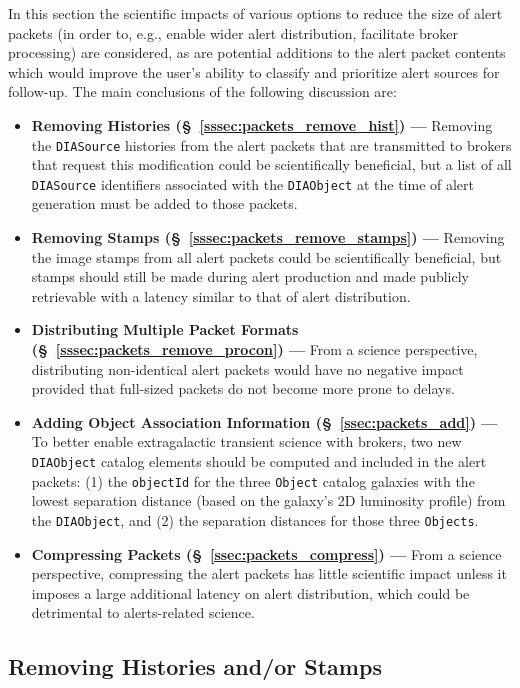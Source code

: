 \documentclass[DM,lsstdraft,authoryear,toc]{lsstdoc}
\begin{document}
In this section the scientific impacts of various options to reduce the size of alert packets (in order to, e.g., enable wider alert distribution, facilitate broker processing) are considered, as are potential additions to the alert packet contents which would improve the user's ability to classify and prioritize alert sources for follow-up.
The main conclusions of the following discussion are:
\begin{itemize}
\item {\bf Removing Histories (\S~\ref{sssec:packets_remove_hist}) ---} Removing the {\tt DIASource} histories from the alert packets that are transmitted to brokers that request this modification could be scientifically beneficial, but a list of all {\tt DIASource} identifiers associated with the {\tt DIAObject} at the time of alert generation must be added to those packets. 
\item {\bf Removing Stamps (\S~\ref{sssec:packets_remove_stamps}) ---} Removing the image stamps from all alert packets could be scientifically beneficial, but stamps should still be made during alert production and made publicly retrievable with a latency similar to that of alert distribution.
\item {\bf Distributing Multiple Packet Formats (\S~\ref{sssec:packets_remove_procon}) ---} From a science perspective, distributing non-identical alert packets would have no negative impact provided that full-sized packets do not become more prone to delays.
\item {\bf Adding Object Association Information (\S~\ref{ssec:packets_add}) ---} To better enable extragalactic transient science with brokers, two new {\tt DIAObject} catalog elements should be computed and included in the alert packets: (1) the {\tt objectId} for the three {\tt Object} catalog galaxies with the lowest separation distance (based on the galaxy's 2D luminosity profile) from the {\tt DIAObject}, and (2) the separation distances for those three {\tt Objects}.
\item {\bf Compressing Packets (\S~\ref{ssec:packets_compress}) ---} From a science perspective, compressing the alert packets has little scientific impact unless it imposes a large additional latency on alert distribution, which could be detrimental to alerts-related science.
\end{itemize}

\subsection{Removing Histories and/or Stamps}\label{ssec:packets_remove}
\end{document}
